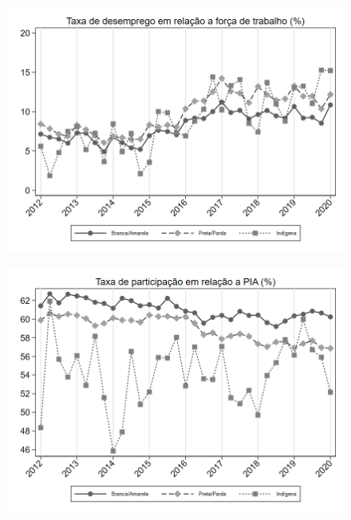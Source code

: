 \begin{frame}[label=_composicao_demografica_raca_taxa_de_desemprego]{}
\textit{\hyperlink{_composicao_demografica_raca}{}}
\begin{figure}
  \centering
  \includegraphics[width=1.0\linewidth]{../../analysis/output/composicao_demografica/raca/_composicao_demografica_raca_taxa_de_desemprego.png}
  \caption{}
  \label{fig:_composicao_demografica_raca_taxa_de_desemprego}
\end{figure}
\end{frame}

\begin{frame}[label=_composicao_demografica_raca_taxa_de_participacao]{}
\textit{\hyperlink{_composicao_demografica_raca}{}}
\begin{figure}
  \centering
  \includegraphics[width=1.0\linewidth]{../../analysis/output/composicao_demografica/raca/_composicao_demografica_raca_taxa_de_participacao.png}
  \caption{}
  \label{fig:_composicao_demografica_raca_taxa_de_participacao}
\end{figure}
\end{frame}

